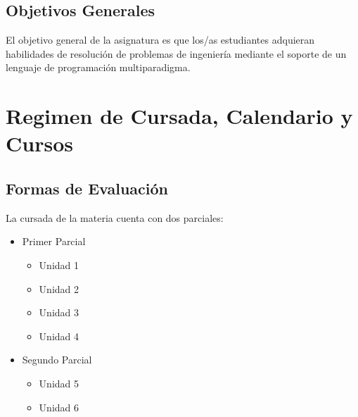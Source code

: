 \documentclass[
  letterpaper,
  DIV=11,
  numbers=noendperiod]{scrreprt}
\providecommand{\tightlist}{%
  \setlength{\itemsep}{0pt}\setlength{\parskip}{0pt}}\usepackage{longtable,booktabs,array}
\begin{document}
\section*{Objetivos Generales}\label{objetivos-generales}


El objetivo general de la asignatura es que los/as estudiantes adquieran
habilidades de resolución de problemas de ingeniería mediante el soporte
de un lenguaje de programación multiparadigma.


\chapter*{Regimen de Cursada, Calendario y
Cursos}\label{regimen-de-cursada-calendario-y-cursos}


\section*{Formas de Evaluación}\label{formas-de-evaluaciuxf3n}


La cursada de la materia cuenta con dos parciales:

\begin{itemize}
\tightlist
\item
  Primer Parcial

  \begin{itemize}
  \tightlist
  \item
    Unidad 1
  \item
    Unidad 2
  \item
    Unidad 3
  \item
    Unidad 4
  \end{itemize}
\item
  Segundo Parcial

  \begin{itemize}
  \tightlist
  \item
    Unidad 5
  \item
    Unidad 6
  \end{itemize}
\end{itemize}
\end{document}
